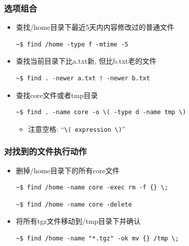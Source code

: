 \documentclass[compress]{beamer}
\begin{document}
\begin{frame}[fragile]
\frametitle{选项组合}

\begin{itemize}
\item 查找/home目录下最近5天内内容修改过的普通文件\\
\begin{Verbatim}
~$ find /home -type f -mtime -5 
\end{Verbatim}


\item 查找当前目录下比a.txt新, 但比b.txt老的文件\\
\begin{Verbatim}
~$ find . -newer a.txt ! -newer b.txt
\end{Verbatim}

\item 查找core文件或者tmp目录\\
\begin{Verbatim}
~$ find . -name core -o \( -type d -name tmp \)
\end{Verbatim}
\begin{itemize}
\item 注意空格: ``\verb*=\( expression \)=''
\end{itemize}

\end{itemize}
\end{frame}

\begin{frame}[fragile]
\frametitle{对找到的文件执行动作}

\begin{itemize}
\item 删掉/home目录下的所有core文件\\
\begin{Verbatim}
~$ find /home -name core -exec rm -f {} \;
\end{Verbatim}

\begin{Verbatim}
~$ find /home -name core -delete
\end{Verbatim}


\item 将所有tgz文件移动到/tmp目录下并确认\\
\begin{Verbatim}
~$ find /home -name "*.tgz" -ok mv {} /tmp \;
\end{Verbatim}
\end{itemize}

\end{frame}
\end{document}

